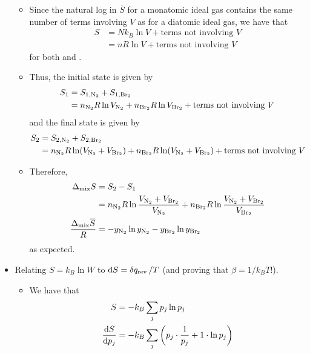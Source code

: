 \documentclass[../notes.tex]{subfiles}
\begin{document}
\begin{itemize}
    \begin{itemize}
        \item Since the natural log in $\overline{S}$ for a monatomic ideal gas contains the same number of terms involving $V$ as for a diatomic ideal gas, we have that
        \begin{align*}
            S &= Nk_B\ln V+\text{terms not involving }V\\
            &= nR\ln V+\text{terms not involving }V
        \end{align*}
        for both  and .
        \item Thus, the initial state is given by
        \begin{align*}
            S_1 &= S_{1,\ce{N2}}+S_{1,\ce{Br2}}\\
            &= n_{\ce{N2}}R\ln V_{\ce{N2}}+n_{\ce{Br2}}R\ln V_{\ce{Br2}}+\text{terms not involving }V
        \end{align*}
        and the final state is given by
        \begin{align*}
            S_2 &= S_{2,\ce{N2}}+S_{2,\ce{Br2}}\\
            &= n_{\ce{N2}}R\ln(V_{\ce{N2}}+V_{\ce{Br2}})+n_{\ce{Br2}}R\ln(V_{\ce{N2}}+V_{\ce{Br2}})+\text{terms not involving }V
        \end{align*}
        \item Therefore,
        \begin{align*}
            \Delta_\text{mix}S &= S_2-S_1\\
            &= n_{\ce{N2}}R\ln\frac{V_{\ce{N2}}+V_{\ce{Br2}}}{V_{\ce{N2}}}+n_{\ce{Br2}}R\ln\frac{V_{\ce{N2}}+V_{\ce{Br2}}}{V_{\ce{Br2}}}\\
            \frac{\Delta_\text{mix}\overline{S}}{R} &= -y_{\ce{N2}}\ln y_{\ce{N2}}-y_{\ce{Br2}}\ln y_{\ce{Br2}}
        \end{align*}
        as expected.
    \end{itemize}
    \item Relating $S=k_B\ln W$ to $\dd{S}=\var{q_\text{rev}}/T$ (and proving that $\beta=1/k_BT$!).
    \begin{itemize}
        \item We have that
        \begingroup
        \allowdisplaybreaks
        \begin{align*}
            S &= -k_B\sum_jp_j\ln p_j\\
            \dv{S}{p_j} &= -k_B\sum_j\left( p_j\cdot\frac{1}{p_j}+1\cdot\ln p_j \right)\\

\end{align*}
\end{itemize}
\end{itemize}
\end{document}
